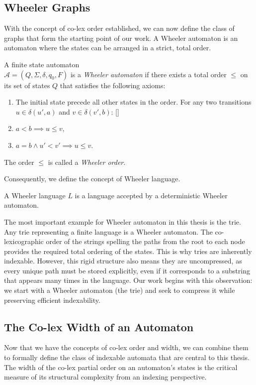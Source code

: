 \subsection{Wheeler Graphs}
With the concept of co-lex order established, we can now define the class of graphs that form the starting point of our work. A Wheeler automaton is an automaton where the states can be arranged in a strict, total order.

\begin{definition}
    \label{def:wheeler_automaton}
    A finite state automaton \\
    $\mathcal{A} = (Q, \Sigma, \delta, q_0, F)$ is a \textit{Wheeler automaton} if there exists a total order $\leq$ on its set of states $Q$ that satisfies the following axioms:
    \begin{enumerate}
        \item The initial state precede all other states in the order.
    For any two transitions $u \in \delta(u', a)$ and $v \in \delta(v', b)$:
    [{}]
        \item $a<b \implies u \leq v$,
        \item $a=b \wedge u' < v' \implies u \leq v$.
    \end{enumerate}
    The order $\leq$ is called a \textit{Wheeler order}.
\end{definition}

Consequently, we define the concept of Wheeler language.
\begin{definition}
    A Wheeler language $L$ is a language accepted by a deterministic Wheeler automaton.
\end{definition}

The most important example for Wheeler automaton in this thesis is the trie. Any trie representing a finite language is a Wheeler automaton. The co-lexicographic order of the strings spelling the paths from the root to each node provides the required total ordering of the states. This is why tries are inherently indexable. However, this rigid structure also means they are uncompressed, as every unique path must be stored explicitly, even if it corresponds to a substring that appears many times in the language. Our work begins with this observation: we start with a Wheeler automaton (the trie) and seek to compress it while preserving efficient indexability.

\subsection{The Co-lex Width of an Automaton}
Now that we have the concepts of co-lex order and width, we can combine them to formally define the class of indexable automata that are central to this thesis. The width of the co-lex partial order on an automaton's states is the critical measure of its structural complexity from an indexing perspective.

